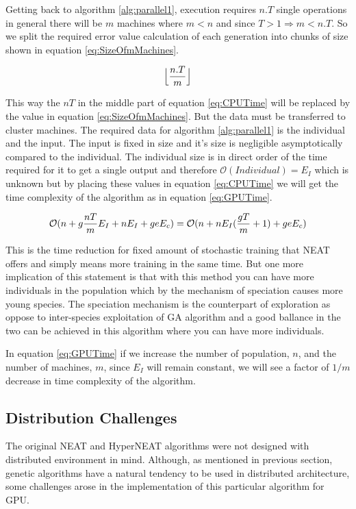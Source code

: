 \documentclass[twocolumn]{article}
\begin{document}
Getting back to algorithm \ref{alg:parallel1}, execution requires $n.T$ single operations in general there will be $m$ machines where $m<n$ and since $T>1 \Rightarrow m<n.T$. So we split the required error value calculation of each generation into chunks of size shown in equation \ref{eq:SizeOfmMachines}.

\begin{equation}
    \label{eq:SizeOfmMachines}
    \Bigl\lfloor \frac{n.T}{m} \Bigr\rfloor    
\end{equation}

This way the $nT$ in the middle part of equation \ref{eq:CPUTime} will be replaced by the value in equation \ref{eq:SizeOfmMachines}. But the data must be transferred to cluster machines. The required data for algorithm \ref{alg:parallel1} is the individual and the input. The input is fixed in size and it's size is negligible asymptotically compared to the individual. The individual size is in direct order of the time required for it to get a single output and therefore $\mathcal{O}(Individual)=E_I$ which is unknown but by placing these values in equation \ref{eq:CPUTime} we will get the time complexity of the algorithm as in equation \ref{eq:GPUTime}.

\begin{equation}
    \label{eq:GPUTime}
    \mathcal{O}(n+g \frac{nT}{m}E_I+nE_I+geE_c)=\\
    \mathcal{O}(n+nE_I(\frac{gT}{m}+1)+geE_c)
\end{equation}

This is the time reduction for fixed amount of stochastic training that NEAT offers and simply means more training in the same time. But one more implication of this statement is that with this method you can have more individuals in the population which by the mechanism of speciation causes more young species. The speciation mechanism is the counterpart of exploration as oppose to inter-species exploitation of GA algorithm and a good ballance in the two can be achieved in this algorithm where you can have more individuals. \cite{ExploreVsExploit}

In equation \ref{eq:GPUTime} if we increase the number of population, $n$, and the number of machines, $m$, since $E_I$ will remain constant, we will see a factor of $1/m$ decrease in time complexity of the algorithm.

\subsection{Distribution Challenges}
The original NEAT and HyperNEAT algorithms were not designed with distributed environment in mind. Although, as mentioned in previous section, genetic algorithms have a natural tendency to be used in distributed architecture, some challenges arose in the implementation of this particular algorithm for GPU.
\end{document}
